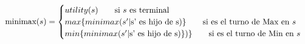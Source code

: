 \documentclass[preview]{standalone}
\begin{document}
\begin{align*}
\text{minimax($s$)} =  \begin{cases}
                                 utility(s) \qquad \text{si $s$ es terminal} \cr
                                 max\{minimax(\text{$s'$}| $s'$ \text{ es hijo de }$s$)\}\qquad \text{si es el turno de Max en $s$} \cr
                                 min\{minimax(\text{$s'$}| $s'$ \text{ es hijo de }$s$)\})\}\qquad \text{si es el turno de Min en $s$} \cr
                                 \end{cases}
\end{align*}
\end{document}
